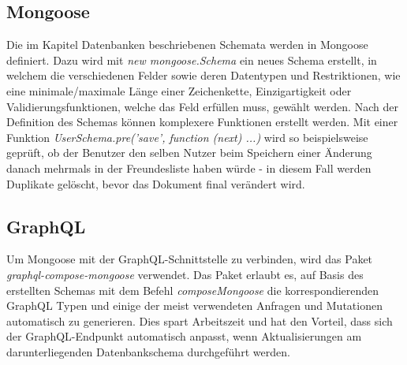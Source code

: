 \subsection{Mongoose}
Die im Kapitel Datenbanken beschriebenen Schemata werden in Mongoose definiert. Dazu wird mit \textit{new mongoose.Schema} ein neues Schema erstellt, in welchem die verschiedenen Felder sowie deren Datentypen und Restriktionen, wie eine minimale/maximale Länge einer Zeichenkette, Einzigartigkeit oder Validierungsfunktionen, welche das Feld erfüllen muss, gewählt werden. Nach der Definition des Schemas können komplexere Funktionen erstellt werden. Mit einer Funktion \textit{UserSchema.pre('save', function (next) {...})} wird so beispielsweise geprüft, ob der Benutzer den selben Nutzer beim Speichern einer Änderung danach mehrmals in der Freundesliste haben würde - in diesem Fall werden Duplikate gelöscht, bevor das Dokument final verändert wird.

\subsection{GraphQL}
Um Mongoose mit der GraphQL-Schnittstelle zu verbinden, wird das Paket \textit{graphql-compose-mongoose} verwendet. Das Paket erlaubt es, auf Basis des erstellten Schemas mit dem Befehl \textit{composeMongoose} die korrespondierenden GraphQL Typen und einige der meist verwendeten Anfragen und Mutationen automatisch zu generieren. Dies spart Arbeitszeit und hat den Vorteil, dass sich der GraphQL-Endpunkt automatisch anpasst, wenn Aktualisierungen am darunterliegenden Datenbankschema durchgeführt werden.